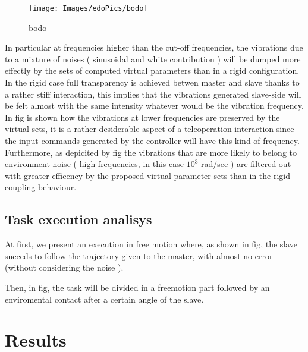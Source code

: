 \begin{figure}[h]
	\centering
	\texttt{[image: Images/edoPics/bodo]}
	\caption{bodo}
	\label{fig:bodo}
\end{figure}


In particular at frequencies higher than the cut-off frequencies, the
vibrations  due to a mixture of noises ( sinusoidal and white contribution ) will
be dumped more effectly by the sets of computed virtual parameters than in a rigid configuration.
In the rigid case full transparency is achieved betwen master and
slave thanks to a rather stiff interaction, this implies that the vibrations
generated slave-side will be felt almost with the same intensity whatever would
be the vibration frequency.
In fig is shown how the vibrations at lower frequencies are preserved by the
virtual sets, it is a rather desiderable aspect of a teleoperation interaction
since the input commands generated by the controller will have this kind of frequency.
Furthermore, as depicited by fig the vibrations that are more likely to belong
to environment noise ( high frequencies, in this case $10^3$ rad/sec ) are
filtered  out with greater efficency by the proposed virtual parameter sets than
in the rigid coupling behaviour.


\subsection{Task execution analisys}

At first, we present an execution in free motion where, as shown in fig, the
slave succeds to follow the trajectory given to the master, with almost no error
(without considering the noise ).

Then, in fig, the task will be divided in a freemotion part followed by an
enviromental contact after a certain angle of the slave.

\section{Results}